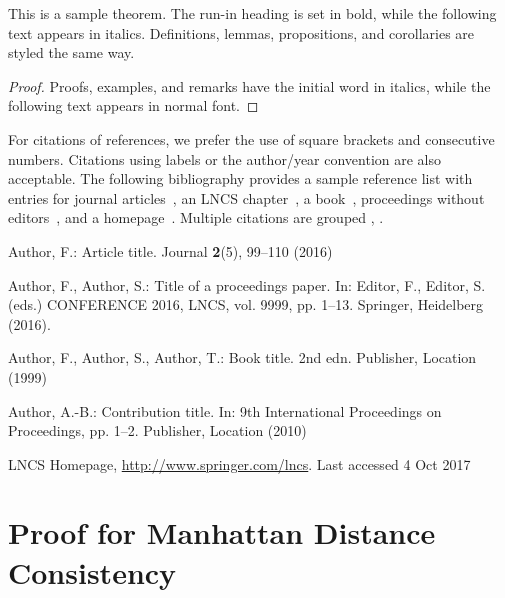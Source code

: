 \documentclass[runningheads]{llncs}
\begin{document}
\begin{theorem}
This is a sample theorem. The run-in heading is set in bold, while
the following text appears in italics. Definitions, lemmas,
propositions, and corollaries are styled the same way.
\end{theorem}
%
%
\begin{proof}
Proofs, examples, and remarks have the initial word in italics,
while the following text appears in normal font.
\end{proof}
For citations of references, we prefer the use of square brackets
and consecutive numbers. Citations using labels or the author/year
convention are also acceptable. The following bibliography provides
a sample reference list with entries for journal
articles~\cite{ref_article1}, an LNCS chapter~\cite{ref_lncs1}, a
book~\cite{ref_book1}, proceedings without editors~\cite{ref_proc1},
and a homepage~\cite{ref_url1}. Multiple citations are grouped
\cite{ref_article1,ref_lncs1,ref_book1},
\cite{ref_article1,ref_book1,ref_proc1,ref_url1}.

%
%
%



\begin{thebibliography}{8}
Author, F.: Article title. Journal \textbf{2}(5), 99--110 (2016)

Author, F., Author, S.: Title of a proceedings paper. In: Editor,
F., Editor, S. (eds.) CONFERENCE 2016, LNCS, vol. 9999, pp. 1--13.
Springer, Heidelberg (2016). 

Author, F., Author, S., Author, T.: Book title. 2nd edn. Publisher,
Location (1999)

Author, A.-B.: Contribution title. In: 9th International Proceedings
on Proceedings, pp. 1--2. Publisher, Location (2010)

LNCS Homepage, \url{http://www.springer.com/lncs}. Last accessed 4
Oct 2017
\end{thebibliography}

\appendix
\section{Proof for Manhattan Distance Consistency}
\label{appendix:manhat_cons}
\end{document}
